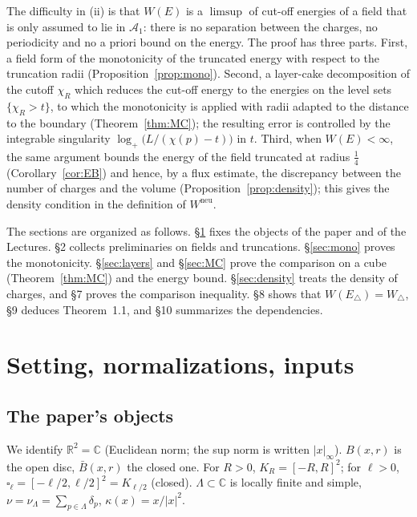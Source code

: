 \documentclass[11pt]{article}
\theoremstyle{definition}
\theoremstyle{remark}
\newcommand{\R}{\mathbb R}
\newcommand{\C}{\mathbb C}
\newcommand{\Lam}{\Lambda}
\newcommand{\Wneu}{W^{\mathrm{neu}}}
\begin{document}
The difficulty in (ii) is that $W(E)$ is a $\limsup$ of cut-off energies of a field that is only assumed to lie in
$\mathcal A_1$: there is no separation between the charges, no periodicity and no a priori bound on the energy.
The proof has three parts.  First, a field form of the monotonicity of the truncated energy with respect to the
truncation radii (Proposition~\ref{prop:mono}).  Second, a layer-cake decomposition of the cutoff $\chi_R$ which
reduces the cut-off energy to the energies on the level sets $\{\chi_R>t\}$, to which the monotonicity is applied
with radii adapted to the distance to the boundary (Theorem~\ref{thm:MC}); the resulting error is controlled by
the integrable singularity $\log_+\!\bigl(L/(\chi(p)-t)\bigr)$ in $t$.  Third, when $W(E)<\infty$, the same argument
bounds the energy of the field truncated at radius $\tfrac14$ (Corollary~\ref{cor:EB}) and hence, by a flux
estimate, the discrepancy between the number of charges and the volume (Proposition~\ref{prop:density}); this gives
the density condition in the definition of $\Wneu$.

The sections are organized as follows.  \S\ref{sec:setting} fixes the objects of the paper and of the Lectures.
\S2 collects preliminaries on fields and truncations.  \S\ref{sec:mono} proves the monotonicity.
\S\ref{sec:layers} and \S\ref{sec:MC} prove the comparison on a cube (Theorem~\ref{thm:MC}) and the energy
bound.  \S\ref{sec:density} treats the density of charges, and \S7 proves the comparison inequality.
\S8 shows that $W(E_\triangle)=W_\triangle$, \S9 deduces Theorem~1.1, and \S10 summarizes the dependencies.

\tableofcontents

\section{Setting, normalizations, inputs}\label{sec:setting}

\subsection{The paper's objects}
We identify $\R^2=\C$ (Euclidean norm; the sup norm is written $|x|_\infty$).  $B(x,r)$ is the open disc,
$\bar B(x,r)$ the closed one.  For $R>0$, $K_R=[-R,R]^2$; for $\ell>0$, $\square_\ell=[-\ell/2,\ell/2]^2=K_{\ell/2}$
(closed).  $\Lam\subset\C$ is locally finite and simple, $\nu=\nu_\Lam=\sum_{p\in\Lam}\delta_p$,
$\kappa(x)=x/|x|^2$.
\end{document}
